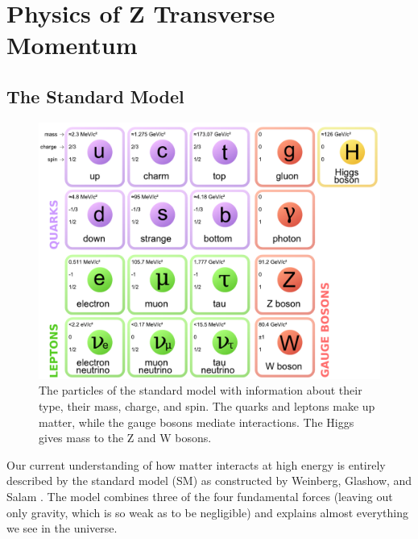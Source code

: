 \chapter{Physics of Z Transverse Momentum}
\label{chapter:theory}

\section{The Standard Model}
\label{section:standard_model}

\begin{figure}[tb]
    \centering
    \includegraphics[width=\textwidth]{figures/standard_model.pdf}
    \caption{The particles of the standard model with information about their
        type, their mass, charge, and spin. The quarks and leptons make up
        matter, while the gauge bosons mediate interactions. The Higgs gives
        mass to the Z and W bosons.
    }

    \label{fig:standard_model}
\end{figure}

Our current understanding of how matter interacts at high energy is entirely
described by the standard model (SM) as constructed by Weinberg, Glashow, and
Salam \cite{glashow1961}\cite{weinberg1967}\cite{salam1968}. The model combines
three of the four fundamental forces (leaving out only gravity, which is so
weak as to be negligible) and explains almost everything we see in the
universe.

